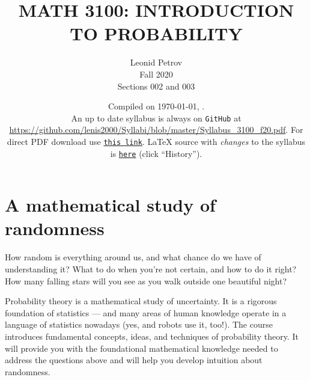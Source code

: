 \documentclass[oneside,11pt]{amsart}
\begin{document}
\title[MATH 3100: INTRODUCTION TO PROBABILITY]{MATH 3100: INTRODUCTION TO PROBABILITY}
\author{Leonid Petrov\\Fall 2020\\Sections 002 and 003}
\date{Compiled on \today, \currenttime.\\An up to date syllabus is always on \texttt{GitHub} at \url{https://github.com/lenis2000/Syllabi/blob/master/Syllabus_3100_f20.pdf}. For direct PDF download use \href{https://github.com/lenis2000/Syllabi/raw/master/Syllabus_3100_f20.pdf}{\texttt{this link}}.
	\LaTeX{} source with \textit{changes} to the syllabus is \href{https://github.com/lenis2000/Syllabi/blob/master/Syllabus_3100_f20.tex}{\texttt{here}}
(click ``History'').}
\maketitle

\bigskip

\section{A mathematical study of randomness}

How random is everything around us, and what chance do we have of understanding it? What to do when you're not certain, and how to do it right? How many falling stars will you see as you walk outside one beautiful night? 

Probability theory is a mathematical study of uncertainty. It is a rigorous foundation of statistics --- and many areas of human knowledge operate in a language of statistics nowadays (yes, and robots use it, too!). The course introduces fundamental concepts, ideas, and techniques of probability theory. It will provide you with the foundational mathematical knowledge needed to address the questions above and will help you develop intuition about randomness.
\end{document}
